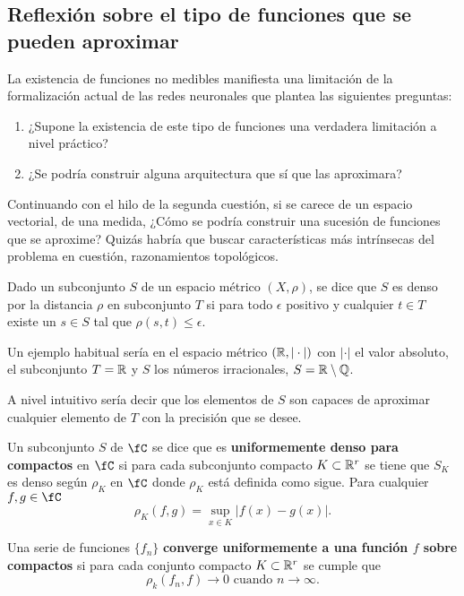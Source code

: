 \subsection{ Reflexión sobre el tipo de funciones que se pueden aproximar}

La existencia de funciones no medibles manifiesta una limitación
de la formalización actual de las redes neuronales que plantea las siguientes 
preguntas: 
\begin{enumerate}
    \item ¿Supone la existencia de este tipo de funciones una verdadera limitación a nivel práctico?
    \item ¿Se podría construir alguna arquitectura que sí que las aproximara?
\end{enumerate}  

Continuando con el hilo de la segunda cuestión, si se carece de un espacio vectorial, 
de una medida,  ¿Cómo se podría construir una sucesión de funciones que se aproxime?
Quizás habría que buscar características más intrínsecas del problema en cuestión, 
razonamientos topológicos.

\begin{definicion}  
    Dado un subconjunto $S$ de un espacio métrico $(X, \rho)$, se dice que $S$ es denso por la distancia $\rho$
    en subconjunto $T$ si para todo $\epsilon$ positivo y cualquier $t \in T$ existe un $s \in S$ tal 
    que $\rho(s,t) \leq \epsilon$. 
\end{definicion}

Un ejemplo habitual sería en el espacio métrico $(\mathbb{R}, |\cdot|)$ con $|\cdot|$ el valor absoluto, el subconjunto 
$T = \mathbb{R}$ y $S$ los números irracionales, $S = \mathbb{R} \setminus \mathbb{Q}$. 

A nivel intuitivo sería decir que los elementos de $S$ son capaces de aproximar cualquier elemento de $T$
con la precisión que se desee. 

\begin{definicion} 
    Un subconjunto $S$ de $\fC$ se dice que es \textbf{uniformemente denso para compactos} en  $\fC$
    si para cada subconjunto compacto $K \subset \mathbb{R}^r$ se tiene que $S_K$ es denso según $\rho_K$ en $\fC$
    donde $\rho_K$ está definida como sigue.
    Para cualquier $f,g \in \fC$ 
    \begin{equation}
        \rho _ K (f,g) = \sup_{x \in K} |f(x) - g(x)|.
    \end{equation}
\end{definicion}

\begin{definicion}
    Una serie de funciones $\{f_n\}$ \textbf{converge uniformemente a una función $f$ sobre compactos} si para 
    cada  conjunto compacto $K \subset \mathbb{R}^r$  se cumple que
    \begin{equation}
        \rho_k (f_n, f) \longrightarrow 0 \text{ cuando } n \longrightarrow \infty.
    \end{equation} 
\end{definicion}

